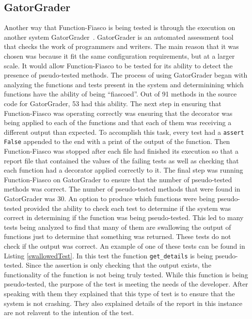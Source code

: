 \subsection{GatorGrader}
Another way that Function-Fiasco is being tested is through the execution on another system GatorGrader~\cite{Gat}. GatorGrader is an automated assessment tool that checks the work of programmers and writers. %
The main reason that it was chosen was because it fit the same configuration requirements, but at a larger scale. It would allow Function-Fiasco to be tested for its ability to detect the presence of pseudo-tested methods. The process of using GatorGrader began with analyzing the functions and tests present in the system and determinining which functions have the ability of being ``fiascoed''. Out of 91 methods in the source code for GatorGrader, 53 had this ability. The next step in ensuring that Function-Fiasco was operating correctly was ensuring that the decorator was being applied to each of the functions and that each of them was receiving a different output than expected. To accomplish this task, every test had a \texttt{assert False} appended to the end with a print of the output of the function. Then Function-Fiasco was stopped after each file had finished its execution so that a report file that contained the values of the failing tests as well as checking that each function had a decorator applied correctly to it. The final step was running Function-Fiasco on GatorGrader to ensure that the number of pseudo-tested methods was correct. The number of pseudo-tested methods that were found in GatorGrader was 30. An option to produce which functions were being pseudo-tested provided the ability to check each test to determine if the system was correct in determining if the function was being pseudo-tested. This led to many tests being analyzed to find that many of them are swallowing the output of functions just to determine that something was returned. These tests do not check if the output was correct. An example of one of these tests can be found in Listing \ref{swallowedTest}. In this test the function \texttt{get\_details} is being pseudo-tested. Since the assertion is only checking that the output exists, the functionality of the function is not being truly tested. While this function is being pseudo-tested, the purpose of the test is meeting the needs of the developer. After speaking with them they explained that this type of test is to ensure that the system is not crashing. They also explained details of the report in this instance are not relavent to the intention of the test.

